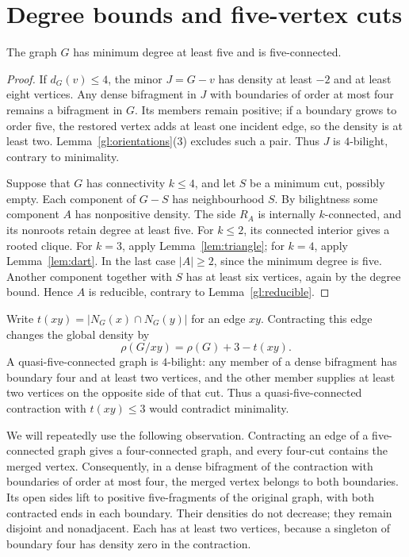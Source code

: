 \section{Degree bounds and five-vertex cuts}
\label{sec:global-cuts}

\begin{lemma}\label{gl:five-connected}
The graph $G$ has minimum degree at least five and is five-connected.
\end{lemma}

\begin{proof}
If $d_G(v)\leq4$, the minor $J=G-v$ has density at least $-2$
and at least eight vertices. Any dense bifragment in $J$ with
boundaries of order at most four remains a bifragment in $G$. Its
members remain positive; if a boundary grows to order five, the
restored vertex adds at least one incident edge, so the density is
at least two. Lemma~\ref{gl:orientations}(3) excludes such a pair.
Thus $J$ is $4$-bilight, contrary to minimality.

Suppose that $G$ has connectivity $k\leq4$, and let $S$ be a minimum
cut, possibly empty. Each component of $G-S$ has neighbourhood $S$.
By bilightness some component $A$ has nonpositive density. The side
$R_A$ is internally $k$-connected, and its nonroots retain degree at
least five. For $k\leq2$, its connected interior gives a rooted
clique. For $k=3$, apply Lemma~\ref{lem:triangle}; for $k=4$,
apply Lemma~\ref{lem:dart}. In the last case $|A|\geq2$, since the
minimum degree is five. Another component together with $S$ has at
least six vertices, again by the degree bound. Hence $A$ is reducible,
contrary to Lemma~\ref{gl:reducible}.
\end{proof}

Write $t(xy)=|N_G(x)\cap N_G(y)|$ for an edge $xy$. Contracting this edge
changes the global density by
\begin{equation}\label{gl:contraction-density}
 \rho(G/xy)=\rho(G)+3-t(xy).
\end{equation}
A quasi-five-connected graph is $4$-bilight: any member of a dense
bifragment has boundary four and at least two vertices, and the
other member supplies at least two vertices on the opposite side of
that cut. Thus a quasi-five-connected contraction with $t(xy)\leq3$
would contradict minimality.

We will repeatedly use the following observation. Contracting an edge
of a five-connected graph gives a four-connected graph, and every
four-cut contains the merged vertex. Consequently, in a dense
bifragment of the contraction with boundaries of order at most four,
the merged vertex belongs to both boundaries. Its open sides lift to
positive five-fragments of the original graph, with both contracted
ends in each boundary. Their densities do not decrease; they remain
disjoint and nonadjacent. Each has at least two vertices, because a
singleton of boundary four has density zero in the contraction.

